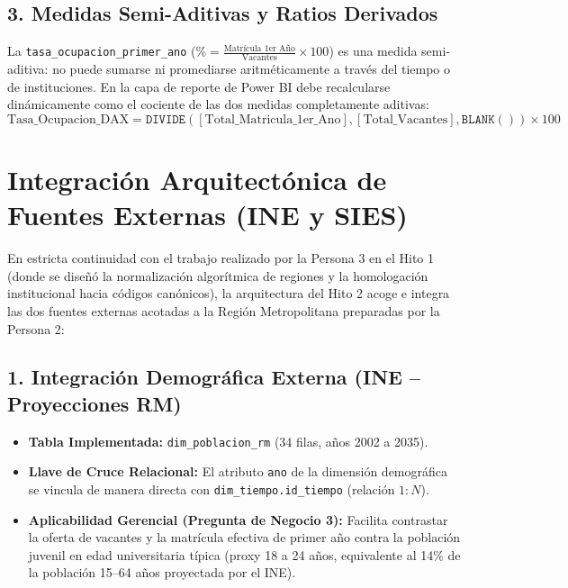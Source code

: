 \documentclass[11pt,a4paper]{article}
\begin{document}
\subsection{3. Medidas Semi-Aditivas y Ratios Derivados}
La \texttt{tasa\_ocupacion\_primer\_ano} ($\% = \frac{\text{Matrícula 1er Año}}{\text{Vacantes}} \times 100$) es una medida semi-aditiva: no puede sumarse ni promediarse aritméticamente a través del tiempo o de instituciones. En la capa de reporte de Power BI debe recalcularse dinámicamente como el cociente de las dos medidas completamente aditivas:
\begin{equation}
\text{Tasa\_Ocupacion\_DAX} = \texttt{DIVIDE}([\text{Total\_Matricula\_1er\_Ano}], [\text{Total\_Vacantes}], \texttt{BLANK}()) \times 100
\end{equation}

\section{Integración Arquitectónica de Fuentes Externas (INE y SIES)}
\label{sec:fuentes_externas}

En estricta continuidad con el trabajo realizado por la Persona 3 en el Hito 1 (donde se diseñó la normalización algorítmica de regiones y la homologación institucional hacia códigos canónicos), la arquitectura del Hito 2 acoge e integra las dos fuentes externas acotadas a la Región Metropolitana preparadas por la Persona 2:

\subsection{1. Integración Demográfica Externa (INE -- Proyecciones RM)}
\begin{itemize}[leftmargin=*]
    \item \textbf{Tabla Implementada:} \texttt{dim\_poblacion\_rm} (34 filas, años 2002 a 2035).
    \item \textbf{Llave de Cruce Relacional:} El atributo \texttt{ano} de la dimensión demográfica se vincula de manera directa con \texttt{dim\_tiempo.id\_tiempo} (relación $1:N$).
    \item \textbf{Aplicabilidad Gerencial (Pregunta de Negocio 3):} Facilita contrastar la oferta de vacantes y la matrícula efectiva de primer año contra la población juvenil en edad universitaria típica (proxy 18 a 24 años, equivalente al 14\% de la población 15--64 años proyectada por el INE).
\end{itemize}
\end{document}
